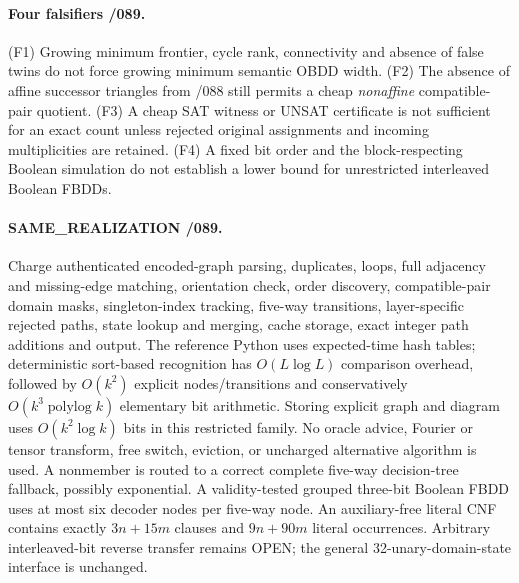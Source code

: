 \documentclass[11pt]{article}
\begin{document}
\paragraph{Four falsifiers /089.}
(F1) Growing minimum frontier, cycle rank, connectivity and absence of false twins do not force growing minimum semantic OBDD width.
(F2) The absence of affine successor triangles from /088 still permits a cheap \emph{nonaffine} compatible-pair quotient.
(F3) A cheap SAT witness or UNSAT certificate is not sufficient for an exact count unless rejected original assignments and incoming multiplicities are retained.
(F4) A fixed bit order and the block-respecting Boolean simulation do not establish a lower bound for unrestricted interleaved Boolean FBDDs.

\paragraph{SAME\_REALIZATION /089.}
Charge authenticated encoded-graph parsing, duplicates, loops, full adjacency and missing-edge matching, orientation check, order discovery, compatible-pair domain masks, singleton-index tracking, five-way transitions, layer-specific rejected paths, state lookup and merging, cache storage, exact integer path additions and output. The reference Python uses expected-time hash tables; deterministic sort-based recognition has $O(L\log L)$ comparison overhead, followed by $O(k^2)$ explicit nodes/transitions and conservatively $O(k^3\operatorname{polylog}k)$ elementary bit arithmetic. Storing explicit graph and diagram uses $O(k^2\log k)$ bits in this restricted family. No oracle advice, Fourier or tensor transform, free switch, eviction, or uncharged alternative algorithm is used. A nonmember is routed to a correct complete five-way decision-tree fallback, possibly exponential.
A validity-tested grouped three-bit Boolean FBDD uses at most six decoder nodes per five-way node. An auxiliary-free literal CNF contains exactly $3n+15m$ clauses and $9n+90m$ literal occurrences. Arbitrary interleaved-bit reverse transfer remains OPEN; the general 32-unary-domain-state interface is unchanged.
\end{document}
